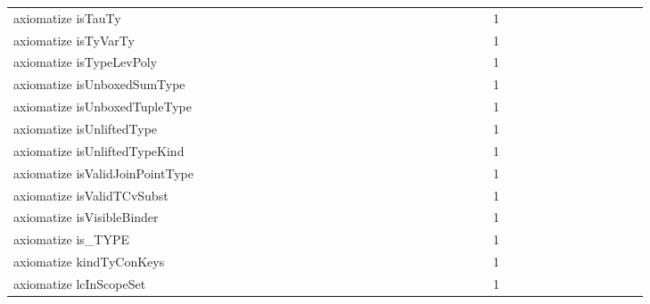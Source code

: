 {\begin{tabular}{l|rrr|rrr|rrr}
axiomatize isTauTy &  &  &  &  &  &  &  &  &  &  &  &  &  &  &  &  &  &  &  &  &  &  &  & 1 &  &  &  &  &  &  &  &  &  &  &  & \\
axiomatize isTyVarTy &  &  &  &  &  &  &  &  &  &  &  &  &  &  &  &  &  &  &  &  &  &  &  & 1 &  &  &  &  &  &  &  &  &  &  &  & \\
axiomatize isTypeLevPoly &  &  &  &  &  &  &  &  &  &  &  &  &  &  &  &  &  &  &  &  &  &  &  & 1 &  &  &  &  &  &  &  &  &  &  &  & \\
axiomatize isUnboxedSumType &  &  &  &  &  &  &  &  &  &  &  &  &  &  &  &  &  &  &  &  &  &  &  & 1 &  &  &  &  &  &  &  &  &  &  &  & \\
axiomatize isUnboxedTupleType &  &  &  &  &  &  &  &  &  &  &  &  &  &  &  &  &  &  &  &  &  &  &  & 1 &  &  &  &  &  &  &  &  &  &  &  & \\
axiomatize isUnliftedType &  &  &  &  &  &  &  &  &  &  &  &  &  &  &  &  &  &  &  &  &  &  &  & 1 &  &  &  &  &  &  &  &  &  &  &  & \\
axiomatize isUnliftedTypeKind &  &  &  &  &  &  &  &  &  &  &  &  &  &  &  &  &  &  &  &  &  &  &  & 1 &  &  &  &  &  &  &  &  &  &  &  & \\
axiomatize isValidJoinPointType &  &  &  &  &  &  &  &  &  &  &  &  &  &  &  &  &  &  &  &  &  &  &  & 1 &  &  &  &  &  &  &  &  &  &  &  & \\
axiomatize isValidTCvSubst &  &  &  &  &  &  &  &  &  &  &  &  &  &  &  &  &  &  &  &  &  &  &  & 1 &  &  &  &  &  &  &  &  &  &  &  & \\
axiomatize isVisibleBinder &  &  &  &  &  &  &  &  &  &  &  &  &  &  &  &  &  &  &  &  &  &  &  & 1 &  &  &  &  &  &  &  &  &  &  &  & \\
axiomatize is_TYPE &  &  &  &  &  &  &  &  &  &  &  &  &  &  &  &  &  &  &  &  &  &  &  & 1 &  &  &  &  &  &  &  &  &  &  &  & \\
axiomatize kindTyConKeys &  &  &  &  &  &  &  &  &  &  &  &  &  &  &  &  &  &  &  &  &  &  &  & 1 &  &  &  &  &  &  &  &  &  &  &  & \\
axiomatize lcInScopeSet &  &  &  &  &  &  &  &  &  &  &  &  &  &  &  &  &  &  &  &  &  &  &  & 1 &  &  &  &  &  &  &  &  &  &  &  & \\

\end{tabular}}
